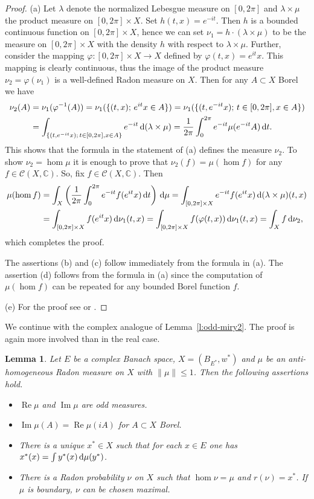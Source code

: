 \documentclass{amsart}
\numberwithin{equation}{section}
\newtheorem{lemma}[thm]{Lemma}
\theoremstyle{definition}
\def\C{\mathcal C}
\def\ce{\mathbb C}
\def\hom{\operatorname{hom}}
\def\di{\,\mbox{\rm d}}
\renewcommand{\Re}{\operatorname{Re}}
\renewcommand{\Im}{\operatorname{Im}}
\newcommand{\setsep}{;\,}
\begin{document}
\begin{proof}
(a) Let $\lambda$ denote the normalized Lebesgue measure on $[0,2\pi]$ and  $\lambda\times \mu$ the product measure on $[0,2\pi]\times X$. Set $h(t,x)=e^{-it}$. Then $h$ is a bounded continuous function on $[0,2\pi]\times X$, hence we can set $\nu_1=h\cdot(\lambda\times\mu)$ to be the measure on $[0,2\pi]\times X$ with the density $h$ with respect to $\lambda\times\mu$. Further, consider the mapping $\varphi:[0,2\pi]\times X\to X$ defined by $\varphi(t,x)=e^{it}x$. This mapping is clearly continuous, thus the image of the product measure $\nu_2=\varphi(\nu_1)$ is a well-defined Radon measure on $X$. Then for any $A\subset X$ Borel we have
$$\begin{aligned}
\nu_2(A)&=\nu_1(\varphi^{-1}(A))=\nu_1(\{(t,x)\setsep e^{it}x\in A\})=
\nu_1(\{(t,e^{-it}x)\setsep t\in[0,2\pi],x\in A\})
\\&=\int_{\{(t,e^{-it}x)\setsep t\in[0,2\pi],x\in A\}} e^{-it}\di(\lambda\times\mu)
=\frac1{2\pi}\int_0^{2\pi}e^{-it}\mu(e^{-it}A)\di t.
\end{aligned}$$
This shows that the formula in the statement of (a) defines the measure $\nu_2$. To show $\nu_2=\hom\mu$ it is enough to prove that $\nu_2(f)=\mu(\hom f)$ for any $f\in\C(X,\ce)$. So, fix $f\in\C(X,\ce)$. Then
$$\begin{aligned}
\mu(\hom f)
&=\int_X\left(\frac1{2\pi}\int_0^{2\pi}e^{-it}f(e^{it} x)\di t\right)\di\mu
=\int_{[0,2\pi]\times X} e^{-it}f(e^{it} x) \di(\lambda\times\mu)(t,x)
\\&=\int_{[0,2\pi]\times X}f(e^{it} x) \di\nu_1(t,x)
=\int_{[0,2\pi]\times X}f(\varphi(t,x)) \di\nu_1(t,x)
=\int_X f\di\nu_2,
\end{aligned}$$
which completes the proof.

The assertions (b) and (c) follow immediately from the formula in (a).
The assertion (d) follows from the formula in (a) since the computation of $\mu(\hom f)$ can be repeated for any bounded Borel function $f$.

(e) For the proof see \cite[Lemma 4.2]{effros} or \cite[\S\,23, Lemma 10]{lacey}.
\end{proof}

We continue with the complex analogue of Lemma~\ref{l:odd-miry2}. The proof is again more involved than in the real case.

\begin{lemma}
\label{l:hom-miry2}
Let $E$ be a complex Banach space, $X=(B_{E^*},w^*)$ and $\mu$ be an anti-homogeneous Radon measure on $X$ with $\|\mu\|\le 1$.
Then the following assertions hold.
\begin{itemize}
	\item[(a)] $\Re\mu$ and $\Im\mu$ are odd measures.
	\item[(b)] $\Im\mu (A)=\Re\mu(iA)$ for $A\subset X$ Borel.
	\item[(c)] There is a unique $x^*\in X$ such that for each $x\in E$ one has $x^*(x)=\int y^*(x)\di\mu(y^*)$.
	\item[(d)] There is a Radon probability $\nu$ on $X$ such that $\hom\nu=\mu$ and $r(\nu)=x^*$. If $\mu$ is boundary, $\nu$ can be chosen maximal.
\end{itemize}
\end{lemma}
\end{document}
